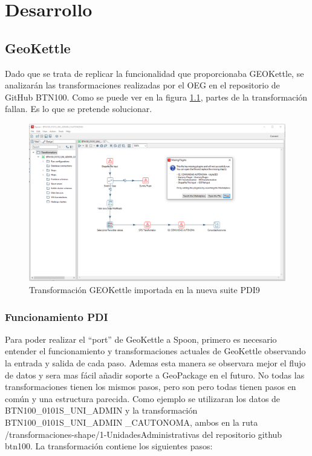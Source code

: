 \chapter{Desarrollo}

\section{GeoKettle}

Dado que se trata de replicar la funcionalidad que proporcionaba GEOKettle, se analizarán las transformaciones
realizadas por el OEG en el repositorio de GitHub BTN100\cite{btn100}. Como se puede ver en la figura
\ref{fig:spoon-missing-plugins}, partes de la transformación fallan. Es lo que se pretende solucionar.

\begin{figure}[H]
    \includegraphics[width=\textwidth]{images/spoon-missing-plugins.png}
    \centering
    \caption{Transformación GEOKettle importada en la nueva suite PDI9}
    \label{fig:spoon-missing-plugins}
\end{figure}

\newpage
\subsection{Funcionamiento PDI}

Para poder realizar el ``port'' de GeoKettle a Spoon, primero es necesario entender el funcionamiento y
transformaciones actuales de GeoKettle observando la entrada y salida de cada paso. Ademas esta manera se
observara mejor el flujo de datos y sera mas fácil añadir soporte a GeoPackage en el futuro. No todas las
transformaciones tienen los mismos pasos, pero son pero todas tienen pasos en común y una estructura parecida.
Como ejemplo se utilizaran los datos de BTN100\_0101S\_UNI\_ADMIN y la transformación
BTN100\_0101S\_UNI\_ADMIN \_CAUTONOMA, ambos en la ruta /transformaciones-shape/1-UnidadesAdministrativas del
repositorio github btn100. La transformación contiene los siguientes pasos:

